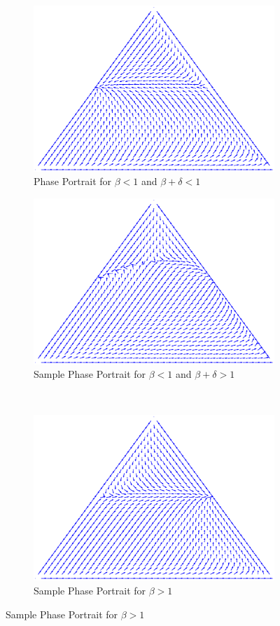 \documentclass[12pt]{report}
\begin{document}
\begin{figure}[htb]
\centering
\begin{subfigure}[b]{0.4 \textwidth}
\caption{Phase Portrait for  $\beta < 1$ and $\beta + \delta < 1$  }
\centering
\includegraphics[width = 0.9 \textwidth]{Diagrams/Dingli/OCOB}
\end{subfigure}

\begin{subfigure}[b]{0.4 \textwidth}
\caption{Sample Phase Portrait for  $\beta < 1$ and $\beta + \delta > 1$  }
\centering
\includegraphics[width = 0.9 \textwidth]{Diagrams/Dingli/bistable}
\end{subfigure}
~
\begin{subfigure}[b]{0.4 \textwidth}
\caption{Sample Phase Portrait for  $\beta > 1$}
\centering
\includegraphics[width = 0.9 \textwidth]{Diagrams/Dingli/OCMM}
\end{subfigure}


\end{figure}
\end{document}
